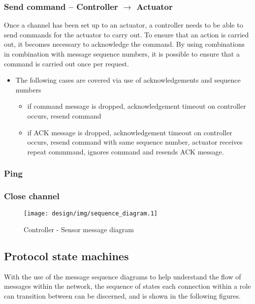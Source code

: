 \subsubsection{Send command -- Controller $\rightarrow$ Actuator} %
\label{ssub:send_command}
Once a channel has been set up to an actuator, a controller needs to be able to send commands for the actuator to carry out. To ensure that an action is carried out, it becomes necessary to acknowledge the command. By using combinations in combination with message sequence numbers, it is possible to ensure that a command is carried out once per request.

\begin{itemize}
	\item The following cases are covered via use of acknowledgements and sequence numbers
	\begin{itemize}
		\item if command message is dropped, acknowledgement timeout on controller occurs, resend command
		\item if ACK message is dropped, acknowledgement timeout on controller occurs, resend command with same sequence number, actuator receives repeat commmand, ignores command and resends ACK message.
	\end{itemize}
\end{itemize}





\subsubsection{Ping} %
\label{ssub:ping}


\subsubsection{Close channel} %
\label{ssub:close_channel}

\begin{figure}[h!]
\centering
\texttt{[image: design/img/sequence\_diagram.1]}
\caption{Controller - Sensor message diagram}
\label{fig:sensorsequence}
\end{figure}
\newpage
\subsection{Protocol state machines} %
\label{sub:states}
With the use of the message sequence diagrams to help understand the flow of messages within the network, the sequence of states each connection within a role can transition between can be discerned, and is shown in the following figures.

